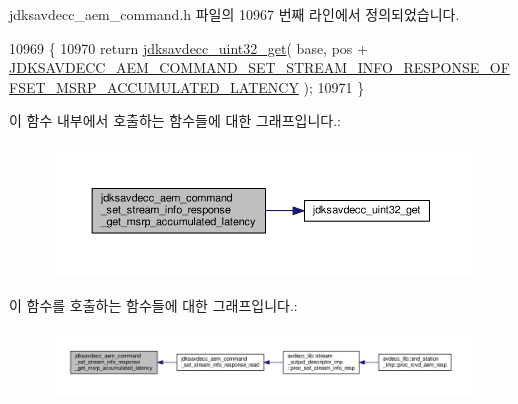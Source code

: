 jdksavdecc\+\_\+aem\+\_\+command.\+h 파일의 10967 번째 라인에서 정의되었습니다.


\begin{DoxyCode}
10969 \{
10970     \textcolor{keywordflow}{return} \hyperlink{group__endian_gaefcf5bd4f368997a82f358ab89052d6b}{jdksavdecc\_uint32\_get}( base, pos + 
      \hyperlink{group__command__set__stream__info__response_gabbe33b5340dd26a3a655f42fa4039ed1}{JDKSAVDECC\_AEM\_COMMAND\_SET\_STREAM\_INFO\_RESPONSE\_OFFSET\_MSRP\_ACCUMULATED\_LATENCY}
       );
10971 \}
\end{DoxyCode}


이 함수 내부에서 호출하는 함수들에 대한 그래프입니다.\+:
\nopagebreak
\begin{figure}[H]
\begin{center}
\leavevmode
\includegraphics[width=350pt]{group__command__set__stream__info__response_gabb817d587079040fde1cdaf0e22bf7dd_cgraph}
\end{center}
\end{figure}




이 함수를 호출하는 함수들에 대한 그래프입니다.\+:
\nopagebreak
\begin{figure}[H]
\begin{center}
\leavevmode
\includegraphics[width=350pt]{group__command__set__stream__info__response_gabb817d587079040fde1cdaf0e22bf7dd_icgraph}
\end{center}
\end{figure}


